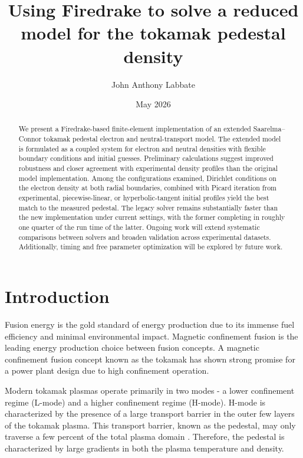 \documentclass[twocolumn,secnumarabic,amssymb, nobibnotes, aps, prd]{revtex4-2}
\begin{document}
\title{Using Firedrake to solve a reduced model for the tokamak pedestal density} 

\author{John Anthony Labbate}

\date{May 2026}%

\begin{abstract}
We present a Firedrake-based finite-element implementation of an extended Saarelma–Connor tokamak pedestal electron and neutral-transport model.
The extended model is formulated as a coupled system for electron and neutral densities with flexible boundary conditions and initial guesses. 
Preliminary calculations suggest improved robustness and closer agreement with experimental density profiles than the original model implementation. 
Among the configurations examined, Dirichlet conditions on the electron density at both radial boundaries, combined with Picard iteration from experimental, piecewise-linear, or hyperbolic-tangent initial profiles yield the best match to the measured pedestal. 
The legacy solver remains substantially faster than the new implementation under current settings, with the former completing in roughly one quarter of the run time of the latter. 
Ongoing work will extend systematic comparisons between solvers and broaden validation across experimental datasets.
Additionally, timing and free parameter optimization will be explored by future work.
\end{abstract}

\maketitle



\section{Introduction}
\label{sect:intro}
Fusion energy is the gold standard of energy production due to its immense fuel efficiency and minimal environmental impact. 
Magnetic confinement fusion is the leading energy production choice between fusion concepts. 
A magnetic confinement fusion concept known as the tokamak has shown strong promise for a power plant design due to high confinement operation.

Modern tokamak plasmas operate primarily in two modes - a lower confinement regime (L-mode) and a higher confinement regime (H-mode).
H-mode is characterized by the presence of a large transport barrier in the outer few layers of the tokamak plasma. 
This transport barrier, known as the pedestal, may only traverse a few percent of the total plasma domain \cite{snyder2011first}.
Therefore, the pedestal is characterized by large gradients in both the plasma temperature and density.
\end{document}
